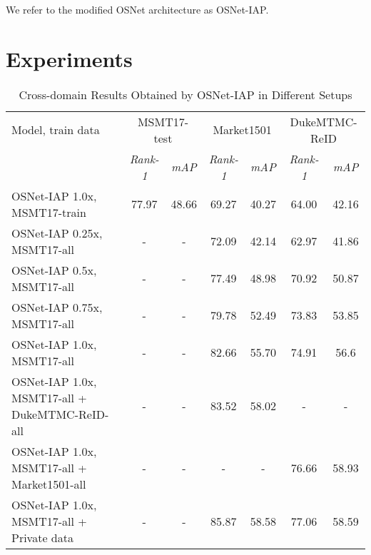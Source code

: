 \documentclass[a4paper,conference]{IEEEtran}
\begin{document}
We refer to the modified OSNet architecture as OSNet-IAP.

\section{Experiments}

\begin{table*}
\caption{Cross-domain Results Obtained by OSNet-IAP in Different Setups}
\label{tab:cross}
  \centering
  \begin{tabular}{l|c|c|c|c|c|c}
    \hline
    Model, train data & \multicolumn{2}{c|}{MSMT17-test} & \multicolumn{2}{c}{Market1501} & \multicolumn{2}{|c}{DukeMTMC-ReID}   \\
    & \textit{Rank-1} & \textit{mAP} & \textit{Rank-1} & \textit{mAP}  & \textit{Rank-1} & \textit{mAP}  \\
    \hline
    OSNet-IAP 1.0x, MSMT17-train & 77.97 & 48.66 & 69.27 & 40.27 & 64.00 & 42.16 \\
    \hline
    OSNet-IAP 0.25x, MSMT17-all & - & - & 72.09 & 42.14 & 62.97 & 41.86 \\
    OSNet-IAP 0.5x, MSMT17-all & - & - & 77.49 & 48.98 & 70.92 & 50.87 \\
    OSNet-IAP 0.75x, MSMT17-all & - & - & 79.78 & 52.49 & 73.83 & 53.85 \\
    OSNet-IAP 1.0x, MSMT17-all & - & - & 82.66 & 55.70 & 74.91 & 56.6 \\
    \hline
    OSNet-IAP 1.0x, MSMT17-all + DukeMTMC-ReID-all & - & - & 83.52 & 58.02 & - & - \\
    OSNet-IAP 1.0x, MSMT17-all + Market1501-all & - & - & - & - & 76.66 & 58.93\\
    \hline
    OSNet-IAP 1.0x, MSMT17-all + Private data & - & - & 85.87 & 58.58 & 77.06 & 58.59 \\
    \hline
  \end{tabular}
\end{table*}
\end{document}
